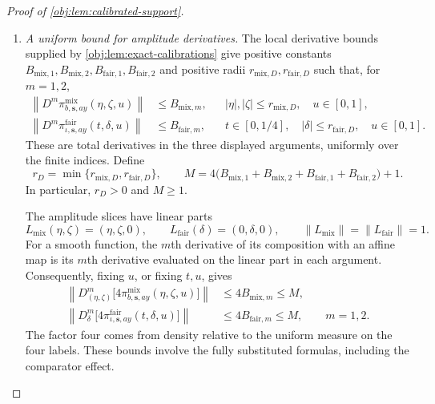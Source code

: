 \begin{proof}[Proof of \cref{obj:lem:calibrated-support}]
\begin{enumerate}
\item \textit{A uniform bound for amplitude derivatives.}
The local derivative bounds supplied by
\cref{obj:lem:exact-calibrations} give positive constants
\(B_{\mathrm{mix},1},B_{\mathrm{mix},2},
 B_{\mathrm{fair},1},B_{\mathrm{fair},2}\)
and positive radii \(r_{\mathrm{mix},D},r_{\mathrm{fair},D}\) such that, for \(m=1,2\),
\[
\begin{aligned}
\left\|D^m\pi^{\mathrm{mix}}_{b,\mathbf s,ay}
                   (\eta,\zeta,u)\right\|
&\le B_{\mathrm{mix},m},
&&|\eta|,|\zeta|\le r_{\mathrm{mix},D},\quad u\in[0,1],\\
\left\|D^m\pi^{\mathrm{fair}}_{\iota,\mathbf s,ay}
                   (t,\delta,u)\right\|
&\le B_{\mathrm{fair},m},
&&t\in[0,1/4],\quad |\delta|\le r_{\mathrm{fair},D},
  \quad u\in[0,1].
\end{aligned}
\]
These are total derivatives in the three displayed arguments, uniformly over the finite indices. Define
\[
r_D=\min\{r_{\mathrm{mix},D},r_{\mathrm{fair},D}\},
\qquad
M=4\bigl(B_{\mathrm{mix},1}+B_{\mathrm{mix},2}
        +B_{\mathrm{fair},1}+B_{\mathrm{fair},2}\bigr)+1.
\]
In particular, \(r_D>0\) and \(M\ge1\).

The amplitude slices have linear parts
\[
L_{\mathrm{mix}}(\eta,\zeta)=(\eta,\zeta,0),
\qquad
L_{\mathrm{fair}}(\delta)=(0,\delta,0),
\qquad
\|L_{\mathrm{mix}}\|=\|L_{\mathrm{fair}}\|=1.
\]
For a smooth function, the \(m\)th derivative of its composition with an affine map is its \(m\)th derivative evaluated on the linear part in each argument. Consequently, fixing \(u\), or fixing \(t,u\), gives
\[
\begin{aligned}
\left\|D^m_{(\eta,\zeta)}
      \bigl[4\pi^{\mathrm{mix}}_{b,\mathbf s,ay}(\eta,\zeta,u)\bigr]\right\|
&\le4B_{\mathrm{mix},m}\le M,\\
\left\|D^m_\delta
      \bigl[4\pi^{\mathrm{fair}}_{\iota,\mathbf s,ay}(t,\delta,u)\bigr]\right\|
&\le4B_{\mathrm{fair},m}\le M,
\qquad m=1,2.
\end{aligned}
\]
The factor four comes from density relative to the uniform measure on the four labels. These bounds involve the fully substituted formulas, including the comparator effect.


\end{enumerate}
\end{proof}
